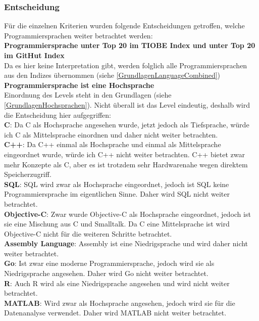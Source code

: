 \documentclass[ngerman]{article}
\begin{document}
    \subsubsection{Entscheidung}
    \label{BinaryLanguageEntscheidung}
    Für die einzelnen Kriterien wurden folgende Entscheidungen getroffen, welche Programmiersprachen weiter betrachtet werden:\\
    \textbf{Programmiersprache unter Top 20 im TIOBE Index und unter Top 20 im GitHut Index}\\
    Da es hier keine Interpretation gibt, werden folglich alle Programmiersprachen aus den Indizes übernommen (siehe \ref{GrundlagenLanguageCombined})\\
    \textbf{Programmiersprache ist eine Hochsprache}\\
    Einordnung des Levels steht in den Grundlagen (siehe \ref{GrundlagenHochsprachen}). Nicht überall ist das Level eindeutig, deshalb wird die Entscheidung hier aufgegriffen:\\
    \textbf{C}: Da C als Hochsprache angesehen wurde, jetzt jedoch als Tiefsprache, würde ich C als Mittelsprache einordnen und daher nicht weiter betrachten.\\
    \textbf{C++}: Da C++ einmal als Hochsprache und einmal als Mittelsprache eingeordnet wurde, würde ich C++ nicht weiter betrachten. C++ bietet zwar mehr Konzepte als C, aber es ist trotzdem sehr Hardwarenahe wegen direktem Speicherzugriff.\\
    \textbf{SQL}: SQL wird zwar als Hochsprache eingeordnet, jedoch ist SQL keine Programmiersprache im eigentlichen Sinne. Daher wird SQL nicht weiter betrachtet.\\
    \textbf{Objective-C}: Zwar wurde Objective-C als Hochsprache eingeordnet, jedoch ist sie eine Mischung aus C und Smalltalk. Da C eine Mittelsprache ist wird Objective-C nicht für die weiteren Schritte betrachtet.\\
    \textbf{Assembly Language}: Assembly ist eine Niedrigsprache und wird daher nicht weiter betrachtet.\\
    \textbf{Go}: Ist zwar eine moderne Programmiersprache, jedoch wird sie als Niedrigsprache angesehen. Daher wird Go nicht weiter betrachtet.\\
    \textbf{R}: Auch R wird als eine Niedrigsprache angesehen und wird nicht weiter betrachtet.\\
    \textbf{MATLAB}: Wird zwar als Hochsprache angesehen, jedoch wird sie für die Datenanalyse verwendet. Daher wird MATLAB nicht weiter betrachtet.\\
\end{document}
